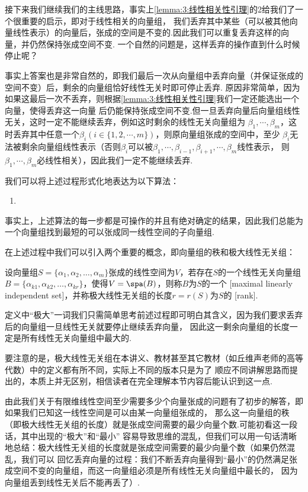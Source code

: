 接下来我们继续我们的主线思路，事实上\autoref{lemma:3:线性相关性引理}的2给我们了一个很重要的启示，即对于线性相关的向量组，
我们丢弃其中某些（可以被其他向量线性表示）的向量后，张成的空间是不变的.因此我们可以重复丢弃这样的向量，并仍然保持张成空间不变.
一个自然的问题是，这样丢弃的操作直到什么时候停止呢？

事实上答案也是非常自然的，即我们最后一次从向量组中丢弃向量（并保证张成的空间不变）后，剩余的向量组恰好线性无关时即可停止丢弃.
原因非常简单，因为如果这最后一次不丢弃，则根据\autoref{lemma:3:线性相关性引理}我们一定还能选出一个向量，使得丢弃这一向量
后仍能保持张成空间不变.但一旦丢弃向量后向量组线性无关，这时一定不能继续丢弃，例如这时剩余的线性无关向量组为
$\beta_1,\cdots,\beta_m$，这时丢弃其中任意一个$\beta_i(i\in\{1,2,\cdots,m\})$，则原向量组张成的空间中，至少
$\beta_i$无法被剩余向量组线性表示（否则$\beta_i$可以被$\beta_1,\cdots,\beta_{i-1},\beta_{i+1},\cdots,\beta_m$线性表示，
则$\beta_1,\cdots,\beta_m$必线性相关），因此我们一定不能继续丢弃.

我们可以将上述过程形式化地表达为以下算法：
\begin{enumerate}
    \item 
\end{enumerate}
事实上，上述算法的每一步都是可操作的并且有绝对确定的结果，因此我们总能为一个向量组找到最短的可以张成同一线性空间的子向量组.

在上述过程中我们可以引入两个重要的概念，即向量组的秩和极大线性无关组：
\begin{definition}
    设向量组$S=\{\alpha_1,\alpha_2,\ldots,\alpha_m\}$张成的线性空间为$V$，若存在$S$的一个线性无关向量组
    $B=\{\alpha_{k1},\alpha_{k2},\ldots,\alpha_{kr}\}$，使得$V=\spa(B)$，则称$B$为$S$的一个
    [maximal linearly independent set]，并称极大线性无关组的长度$r=r(S)$为$S$的
    [rank].
\end{definition}
定义中``极大''一词我们只需简单思考前述过程即可明白其含义，因为我们要求丢弃后的向量组一旦线性无关就要停止继续丢弃向量，
因此这一剩余向量组的长度一定是所有线性无关向量组中最大的.

要注意的是，极大线性无关组在本讲义、教材甚至其它教材（如丘维声老师的高等代数）中的定义都有所不同，实际上不同的版本只是为了
顺应不同讲解思路而提出的，本质上并无区别，相信读者在完全理解本节内容后能认识到这一点.

由此我们关于有限维线性空间至少需要多少个向量张成的问题有了初步的解答，即如果我们已知这一线性空间是可以由某一向量组张成的，
那么这一向量组的秩（即极大线性无关组的长度）就是张成空间需要的最少向量个数.可能初看这一段话，其中出现的``极大''和``最小''
容易导致思维的混乱，但我们可以用一句话清晰地总结：极大线性无关组的长度就是张成空间需要的最少向量个数（如果仍然混乱，我们可以
回忆丢弃向量的过程：我们不断丢弃向量得到``最小''的仍然满足张成空间不变的向量组，而这一向量组必须是所有线性无关向量组中最长的，
因为向量组丢到线性无关后不能再丢了）.

